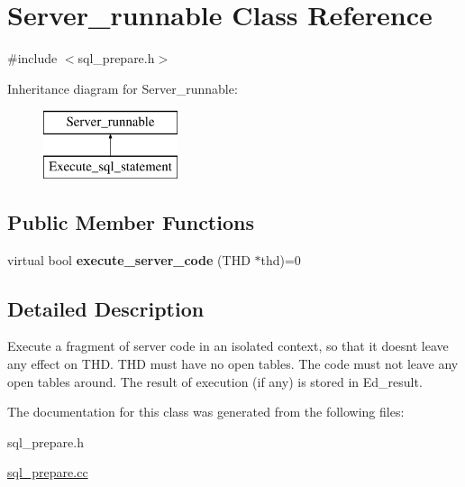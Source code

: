 \hypertarget{classServer__runnable}{}\section{Server\+\_\+runnable Class Reference}
\label{classServer__runnable}


{\ttfamily \#include $<$sql\+\_\+prepare.\+h$>$}

Inheritance diagram for Server\+\_\+runnable\+:\begin{figure}[H]
\begin{center}
\leavevmode
\includegraphics[height=2.000000cm]{classServer__runnable}
\end{center}
\end{figure}
\subsection*{Public Member Functions}
\begin{DoxyCompactItemize}
\item 
\mbox{\label{classServer__runnable_a6e51c48082c0f2bd541e6e4979933dcb}} 
virtual bool {\bfseries execute\+\_\+server\+\_\+code} (T\+HD $\ast$thd)=0
\end{DoxyCompactItemize}


\subsection{Detailed Description}
Execute a fragment of server code in an isolated context, so that it doesn\textquotesingle{}t leave any effect on T\+HD. T\+HD must have no open tables. The code must not leave any open tables around. The result of execution (if any) is stored in Ed\+\_\+result. 

The documentation for this class was generated from the following files\+:\begin{DoxyCompactItemize}
\item 
sql\+\_\+prepare.\+h\item 
\mbox{\hyperlink{sql__prepare_8cc}{sql\+\_\+prepare.\+cc}}\end{DoxyCompactItemize}
